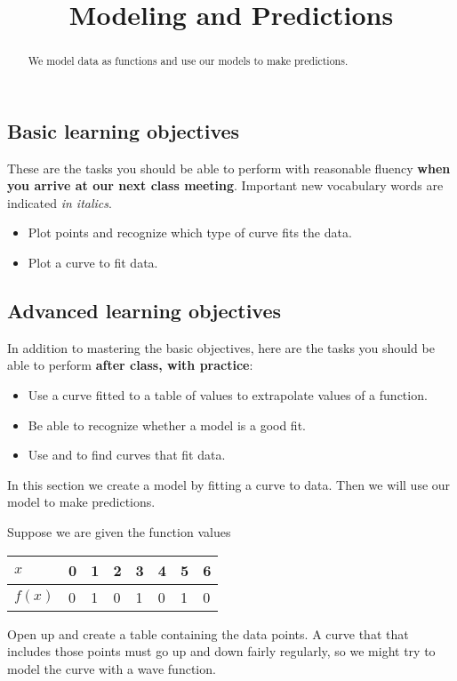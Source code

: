 \documentclass{ximera}
\title{Modeling and Predictions}
\begin{document}
\begin{abstract}
We model data as functions and use our models to make predictions.
\end{abstract}
\maketitle

\subsection*{Basic learning objectives}

These are the tasks you should be able to perform with reasonable fluency \textbf{when you arrive at our next class meeting}. Important new vocabulary words are indicated \emph{in italics}. 

\begin{itemize}
	\item Plot points and recognize which type of curve fits the data.
	\item Plot a curve to fit data.
\end{itemize}

\subsection*{Advanced learning objectives}

In addition to mastering the basic objectives, here are the tasks you should be able to perform \textbf{after class, with practice}: 

\begin{itemize}
	\item Use a curve fitted to a table of values to extrapolate values of a function.
    \item Be able to recognize whether a model is a good fit.
    \item Use  and  to find curves that fit data.
\end{itemize}

\noindent\hrulefill

In this section we create a model by fitting a curve to data. Then we will use our model to make predictions.

Suppose we are given the function values 
\begin{center} 
    \begin{tabular}{llllllll}
    $x$  & 0 & 1 & 2 & 3 & 4 & 5 & 6 \\ \hline
    $f(x)$ & 0 & 1 & 0 & 1 & 0 & 1 & 0 \\
    \end{tabular}
\end{center}
Open up  and create a table containing the data points. A curve that that includes those points must go up and down fairly regularly, so we might try to model the curve with a wave function.
\end{document}
